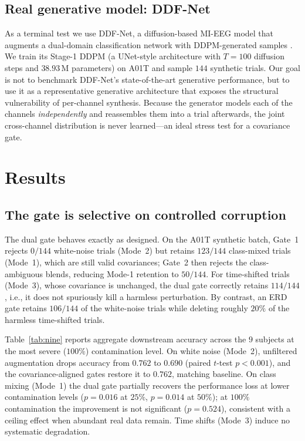 \documentclass[conference]{IEEEtran}
\begin{document}
\subsection{Real generative model: DDF-Net}
\label{sec:ddfnet}

As a terminal test we use DDF-Net, a diffusion-based MI-EEG model that augments
a dual-domain classification network with DDPM-generated samples
\cite{li2026diffusion}. We train its Stage-1 DDPM (a UNet-style architecture
with $T=100$ diffusion steps and $38.93$\,M parameters) on A01T and sample
$144$ synthetic trials. Our goal is not to benchmark DDF-Net's state-of-the-art
generative performance, but to use it as a representative generative
architecture that exposes the structural vulnerability of per-channel synthesis.
Because the generator models each of the channels
\emph{independently} and reassembles them into a trial afterwards, the joint
cross-channel distribution is never learned---an ideal stress test for a
covariance gate.

\section{Results}
\label{sec:results}

\subsection{The gate is selective on controlled corruption}
\label{sec:results-controlled}

The dual gate behaves exactly as designed. On the A01T synthetic batch, Gate~1
rejects $0/144$ white-noise trials (Mode~2) but retains $123/144$ class-mixed
trials (Mode~1), which are still valid covariances; Gate~2 then rejects the
class-ambiguous blends, reducing Mode-1 retention to $50/144$. For time-shifted
trials (Mode~3), whose covariance is unchanged, the dual gate correctly retains
$114/144$, i.e., it does not spuriously kill a harmless perturbation. By
contrast, an ERD gate retains $106/144$ of the white-noise trials while deleting
roughly $20\%$ of the harmless time-shifted trials.

Table~\ref{tab:nine} reports aggregate downstream accuracy across the $9$
subjects at the most severe ($100\%$) contamination level. On white noise
(Mode~2), unfiltered augmentation drops accuracy from $0.762$ to $0.690$
(paired $t$-test $p<0.001$), and the covariance-aligned gates restore it to
$0.762$, matching baseline. On class mixing (Mode~1) the dual gate partially recovers
the performance loss at lower contamination levels ($p=0.016$ at $25\%$,
$p=0.014$ at $50\%$); at $100\%$ contamination the improvement is not
significant ($p=0.524$), consistent with a ceiling effect when abundant real
data remain. Time shifts (Mode~3) induce no systematic degradation.
\end{document}
